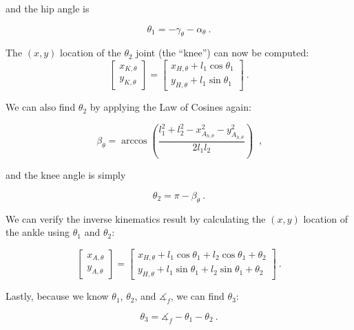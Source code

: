 \documentclass{report}
\begin{document}
and the hip angle is

\begin{equation}
\theta_1 = -\gamma_\theta - \alpha_\theta\ \text{.}
\end{equation}

The $(x,y)$ location of the $\theta_2$ joint (the ``knee'') can now be computed:
\begin{equation*}
\begin{bmatrix}
x_{K,\theta}\\
y_{K,\theta}
\end{bmatrix} = \begin{bmatrix}
x_{H,\theta} + l_1 \cos{\theta_1}\\
y_{H,\theta} + l_1 \sin{\theta_1}
\end{bmatrix}\ \text{.}
\end{equation*}

We can also find $\theta_2$ by applying the Law of Cosines again:

\begin{equation*}
\beta_\theta = \arccos{\left( \frac{l_1^2 + l_2^2 - x_{A_{h,\theta}}^2 - y_{A_{h,\theta}} ^2}{2 l_1 l_2}\right) }\ \text{ ,}
\end{equation*}

and the knee angle is simply

\begin{equation}
\theta_2 = \pi - \beta_\theta\ \text{.}
\end{equation}

We can verify the inverse kinematics result by calculating the $(x, y)$ location of the ankle using $\theta_1$ and $\theta_2$:

\begin{equation*}
\begin{bmatrix}
x_{A,\theta}\\
y_{A,\theta}
\end{bmatrix} = \begin{bmatrix}
x_{H,\theta} + l_1 \cos{\theta_1} + l_2 \cos{\theta_1 + \theta_2}\\
y_{H,\theta} + l_1 \sin{\theta_1} + l_2 \sin{\theta_1 + \theta_2}
\end{bmatrix}\ \text{.}
\end{equation*}

Lastly, because we know $\theta_1$, $\theta_2$, and $\measuredangle_f$, we can find $\theta_3$:

\begin{equation}
\theta_3 = \measuredangle_f - \theta_1 - \theta_2\ \text{.}
\end{equation}
\end{document}
